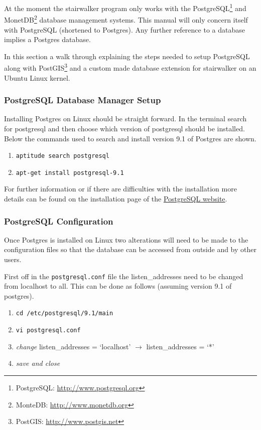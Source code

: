 At the moment the stairwalker program only works with the PostgreSQL\footnote{PostgreSQL: \url{http://www.postgresql.org}} and MonetDB\footnote{MonteDB: \url{http://www.monetdb.org}} database management systems. This manual will only concern itself with PostgreSQL (shortened to Postgres). Any further reference to a database implies a Postgres database.

In this section a walk through explaining the steps needed to setup PostgreSQL along with PostGIS\footnote{PostGIS: \url{http://www.postgis.net}} and a custom made database extension for stairwalker on an Ubuntu Linux kernel.

\subsubsection{PostgreSQL Database Manager Setup}
Installing Postgres on Linux should be straight forward. In the terminal search for postgresql and then choose which version of postgresql should be installed. Below the commands used to search and install version 9.1 of Postgres are shown.
\begin{enumerate}
	\item \lstinline$aptitude search postgresql$
	\item \lstinline$apt-get install postgresql-9.1$
\end{enumerate}
For further information or if there are difficulties with the installation more details can be found on the installation page of the \href{http://www.postgresql.org/download/}{PostgreSQL website}.  

\subsubsection{PostgreSQL Configuration}
Once Postgres is installed on Linux two alterations will need to be made to the configuration files so that the database can be accessed from outside and by other users.

First off in the \lstinline$postgresql.conf$ file the listen\_addresses need to be changed from localhost to all. This can be done as follows (assuming version 9.1 of postgres).

\begin{enumerate}
	\item \lstinline$cd /etc/postgresql/9.1/main$
	\item \lstinline$vi postgresql.conf$
	\item \textit{change} listen\_addresses = `localhost' $\rightarrow$ listen\_addresses = `*'
	\item \textit{save and close}
\end{enumerate}

